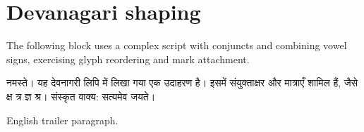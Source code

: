 \documentclass[12pt]{article}
\begin{document}
\section*{Devanagari shaping}

The following block uses a complex script with conjuncts and combining
vowel signs, exercising glyph reordering and mark attachment.

{\devafont
नमस्ते। यह देवनागरी लिपि में लिखा गया एक उदाहरण है। इसमें संयुक्ताक्षर
और मात्राएँ शामिल हैं, जैसे क्ष त्र ज्ञ श्र। संस्कृत वाक्य: सत्यमेव जयते।
}

English trailer paragraph.
\end{document}
